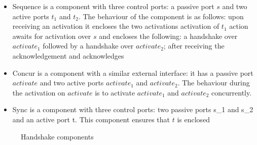 \begin{itemize}
\item
Sequence is a component with three control ports: a passive port $s$ and two active ports $t_1$ and $t_2$.
The behaviour of the component is as follows: upon receiving an activation it encloses the two activations activation of $t_1$ action   awaits for activation over $s$ and encloses the following: a handshake over $activate_1$ followed by a handshake over $activate_2$; after receiving the acknowledgement  and acknowledges

\item
Concur is a component with a similar external interface: it has a passive port $activate$ and two active ports $activate_1$ and $activate_2$.
The behaviour during the activation on $activate$ is to activate $activate_1$ and $activate_2$ concurrently.

\item
Sync is a component with three control ports: two passive ports s_1 and s_2 and an active port t. 
This component ensures that $t$ is enclosed 
\end{itemize}



\begin{figure}
\centering
{} {}
 {}
 {}
 {}
 {}
 {}

\caption{Handshake components}
\end{figure}





